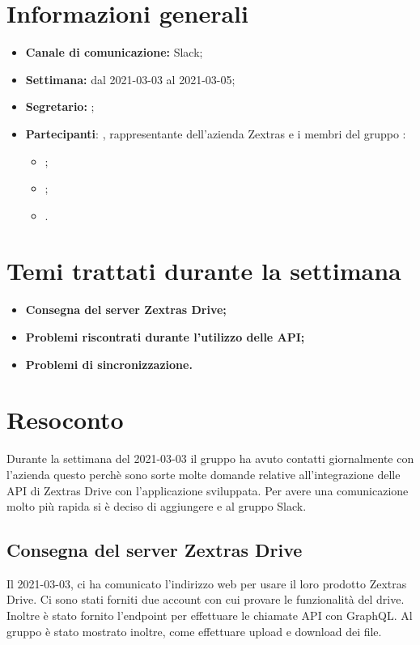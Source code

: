 \section{Informazioni generali}

\begin{itemize}

    \item \textbf{Canale di comunicazione:} Slack;

    \item \textbf{Settimana:} dal 2021-03-03 al 2021-03-05;

    \item \textbf{Segretario:} \Davide{};

    \item \textbf{Partecipanti}: \Federico{}, rappresentante dell'azienda Zextras e i membri del gruppo \Gruppo{}:
        \begin{itemize}
            \item \Daniele{};
            \item \Davide{};
            \item \Matteo{}.
        \end{itemize}

\end{itemize}
\section{Temi trattati durante la settimana}

\begin{itemize}
    \item\textbf{Consegna del server Zextras Drive;}
    \item\textbf{Problemi riscontrati durante l'utilizzo delle API;}
    \item\textbf{Problemi di sincronizzazione.}
\end{itemize}
\newpage


\section{Resoconto}
Durante la settimana del 2021-03-03 il gruppo \textit{\Gruppo{}} ha avuto contatti giornalmente con l'azienda questo perchè sono sorte molte domande relative all'integrazione delle API di Zextras Drive con l'applicazione sviluppata.
Per avere una comunicazione molto più rapida si è deciso di aggiungere \Alessio{} e \Federico{} al gruppo Slack.

\subsection{Consegna del server Zextras Drive}
Il 2021-03-03, \Federico{} ci ha comunicato l'indirizzo web per usare il loro prodotto Zextras Drive. Ci sono stati forniti due account con cui provare le funzionalità del drive.
Inoltre è stato fornito l'endpoint per effettuare le chiamate API con GraphQL. Al gruppo è stato mostrato inoltre, come effettuare upload e download dei file.

